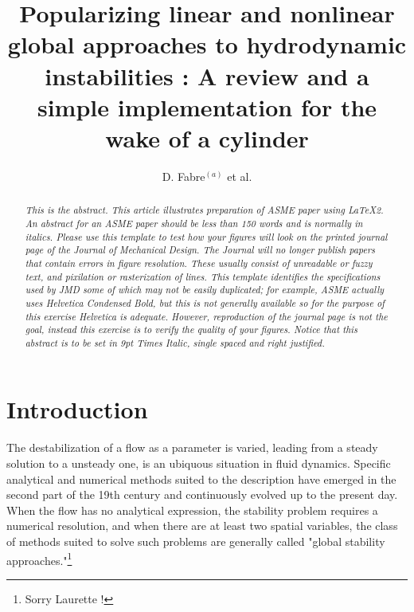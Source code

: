 \documentclass[twocolumn,10pt]{asme2ej}
\title{Popularizing linear and nonlinear global approaches to hydrodynamic instabilities : 
A review and a simple implementation for the wake of a cylinder}
\author{D. Fabre$^{(a)}$ et al.%
    \affiliation{
	IMFT, University of Toulouse
    }	
}
\begin{document}
\lstset{numbers=left, numberstyle=\small, numbersep=8pt, frame = single, language=Matlab, framexleftmargin=15pt}

\maketitle    

\begin{abstract}
{\it This is the abstract.
This article illustrates preparation of ASME paper using 
\LaTeX2\raisebox{-.3ex}{$\epsilon$}.
An abstract for an ASME paper should be less than 150 words and is normally in italics.
Please use this template to test how your figures will look on the printed journal page of the Journal of Mechanical Design.  The Journal will no longer publish papers that contain errors in figure resolution.  These usually consist of unreadable or fuzzy text, and pixilation or rasterization of lines.  This template identifies the specifications used by JMD some of which may not be easily duplicated; for example, ASME actually uses Helvetica Condensed Bold, but this is not generally available so for the purpose of this exercise Helvetica is adequate.  However, reproduction of the journal page is not the goal, instead this exercise is to verify the quality of your figures. Notice that this abstract is to be set in 9pt Times Italic, single spaced and right justified.  
}
\end{abstract}



\section{Introduction}

The destabilization of a flow as a parameter is varied, leading from a steady solution to a unsteady one, is an ubiquous situation in fluid dynamics. Specific analytical and numerical methods suited to the description have emerged in the second part of the 19th century and continuously evolved up to the present day. When the flow has no analytical expression, the stability problem requires a numerical resolution, and when there are at least two spatial variables, the class of methods suited to solve such problems are generally called "global stability approaches."\footnote{Sorry Laurette !}
\end{document}
